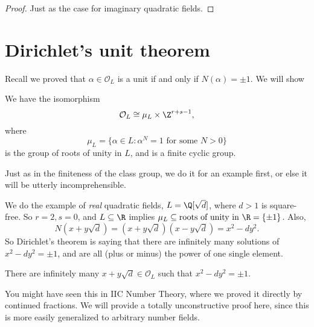 \documentclass[a4paper]{article}
\begin{document}
\begin{proof}
  Just as the case for imaginary quadratic fields.
\end{proof}

\section{Dirichlet's unit theorem}
Recall we proved that $\alpha \in \mathcal{O}_L$ is a unit if and only if $N(\alpha) = \pm 1$. We will show
\begin{thm}
  We have the isomorphism
  \[
    \mathcal{O}_L \cong \mu_L \times \Z^{r + s - 1},
  \]
  where
  \[
    \mu_L = \{\alpha \in L: \alpha^N = 1\text{ for some }N > 0\}
  \]
  is the group of roots of unity in $L$, and is a finite cyclic group.
\end{thm}

Just as in the finiteness of the class group, we do it for an example first, or else it will be utterly incomprehensible.

We do the example of \emph{real} quadratic fields, $L = \Q[\sqrt{d}]$, where $d > 1$ is square-free. So $r = 2, s = 0$, and $L \subseteq \R$ implies $\mu_L \subseteq\text{roots of unity in }\R = \{\pm 1\}$. Also,
\[
  N(x + y\sqrt{d}) = (x + y\sqrt{d})(x - y\sqrt{d}) = x^2 - dy^2.
\]
So Dirichlet's theorem is saying that there are infinitely many solutions of $x^2 - dy^2 = \pm 1$, and are all (plus or minus) the power of one single element.

\begin{thm}
  There are infinitely many $x + y\sqrt{d} \in \mathcal{O}_L$ such that $x^2 - dy^2 = \pm 1$.
\end{thm}
You might have seen this in IIC Number Theory, where we proved it directly by continued fractions. We will provide a totally unconstructive proof here, since this is more easily generalized to arbitrary number fields.
\end{document}
